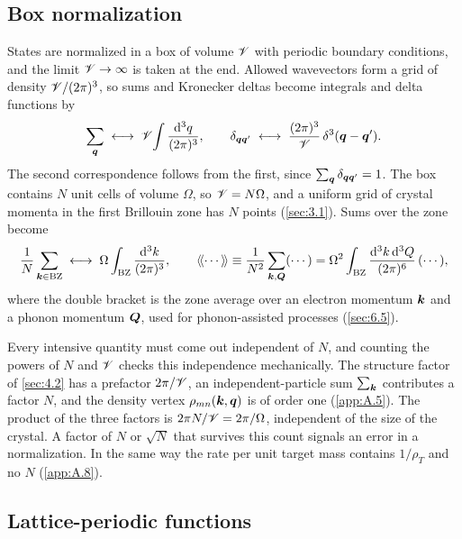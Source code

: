 \subsection{Box normalization}

States are normalized in a box of volume $\mathscr{V}$ with periodic boundary conditions, and the limit $\mathscr{V} \to\infty$ is taken at the end. Allowed wavevectors form a grid of density $\mathscr{V}/(2\pi)^3$, so sums and Kronecker deltas become integrals and delta functions by
\begin{equation}
  \sum_{\bm{q}} \;\longleftrightarrow\; \mathscr{V}\!\int\frac{\mathrm{d}^3q}{(2\pi)^3}, \qquad
  \delta_{\bm{q}\bm{q}'} \;\longleftrightarrow\; \frac{(2\pi)^3}{\mathscr{V}}\,\delta^3(\bm{q} - \bm{q}').
  \label{eq:A.3-box}
\end{equation}
The second correspondence follows from the first, since $\sum_{\bm{q}}\delta_{\bm{q}\bm{q}'} = 1$. The box contains $N$ unit cells of volume $\Omega$, so $\mathscr{V} = N\Omega$, and a uniform grid of crystal momenta in the first Brillouin zone has $N$ points (\cref{sec:3.1}). Sums over the zone become
\begin{equation}
  \frac{1}{N}\sum_{\bm{k}\in\mathrm{BZ}} \;\longleftrightarrow\; \Omega\int_{\mathrm{BZ}}\frac{\mathrm{d}^3k}{(2\pi)^3}, \qquad
  \langle\!\langle \cdots \rangle\!\rangle \equiv \frac{1}{N^2}\sum_{\bm{k},\bm{Q}} (\cdots) = \Omega^2\int_{\mathrm{BZ}}\frac{\mathrm{d}^3k\,\mathrm{d}^3Q}{(2\pi)^6}\,(\cdots),
  \label{eq:A.3-BZ}
\end{equation}
where the double bracket is the zone average over an electron momentum $\bm{k}$ and a phonon momentum $\bm{Q}$, used for phonon-assisted processes (\cref{sec:6.5}).

Every intensive quantity must come out independent of $N$, and counting the powers of $N$ and $\mathscr{V}$ checks this independence mechanically. The structure factor of \cref{sec:4.2} has a prefactor $2\pi/\mathscr{V}$, an independent-particle sum $\sum_{\bm{k}}$ contributes a factor $N$, and the density vertex $\rho_{mn}(\bm{k},\bm{q})$ is of order one (\cref{app:A.5}). The product of the three factors is $2\pi N/\mathscr{V} = 2\pi/\Omega$, independent of the size of the crystal. A factor of $N$ or $\sqrt N$ that survives this count signals an error in a normalization. In the same way the rate per unit target mass contains $1/\rho_T$ and no $N$ (\cref{app:A.8}).

\subsection{Lattice-periodic functions}

